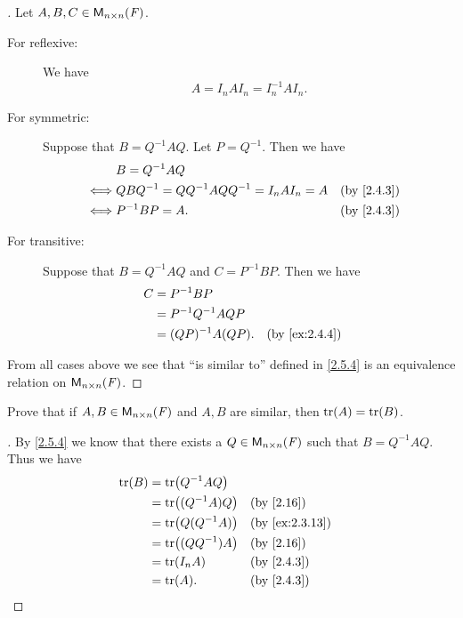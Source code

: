 \begin{proof}[]
  Let \(A, B, C \in \mathsf{M}_{{n} \times n}({\mathit{F}})\).
  \begin{description}
    \item[For reflexive:]
      We have
      \[
        A = I_n A I_n = I_n^{-1} A I_n.
      \]
    \item[For symmetric:]
      Suppose that \(B = Q^{-1} A Q\).
      Let \(P = Q^{-1}\).
      Then we have
      \begin{align*}
             & B = Q^{-1} A Q                                                                 \\
        \iff & Q B Q^{-1} = Q Q^{-1} A Q Q^{-1} = I_n A I_n = A &  & \text{(by \cref{2.4.3})} \\
        \iff & P^{-1} B P = A.                                  &  & \text{(by \cref{2.4.3})}
      \end{align*}
    \item[For transitive:]
      Suppose that \(B = Q^{-1} A Q\) and \(C = P^{-1} B P\).
      Then we have
      \begin{align*}
        C & = P^{-1} B P                                           \\
          & = P^{-1} Q^{-1} A Q P                                  \\
          & = (QP)^{-1} A (QP).   &  & \text{(by \cref{ex:2.4.4})}
      \end{align*}
  \end{description}
  From all cases above we see that ``is similar to'' defined in \cref{2.5.4} is an equivalence relation on \(\mathsf{M}_{{n} \times n}({\mathit{F}})\).
\end{proof}

\begin{ex}\label{ex:2.5.10}
  Prove that if \(A, B \in \mathsf{M}_{{n} \times n}({\mathit{F}})\) and \(A, B\) are similar, then \(\tr[A] = \tr[B]\).
\end{ex}

\begin{proof}[]
  By \cref{2.5.4} we know that there exists a \(Q \in \mathsf{M}_{{n} \times n}({\mathit{F}})\) such that \(B = Q^{-1} A Q\).
  Thus we have
  \begin{align*}
    \tr[B] & = \tr[Q^{-1} A Q]                                     \\
           & = \tr[(Q^{-1} A) Q] &  & \text{(by \cref{2.16})}      \\
           & = \tr[Q (Q^{-1} A)] &  & \text{(by \cref{ex:2.3.13})} \\
           & = \tr[(Q Q^{-1}) A] &  & \text{(by \cref{2.16})}      \\
           & = \tr[I_n A]        &  & \text{(by \cref{2.4.3})}     \\
           & = \tr[A].           &  & \text{(by \cref{2.4.3})}
  \end{align*}
\end{proof}

